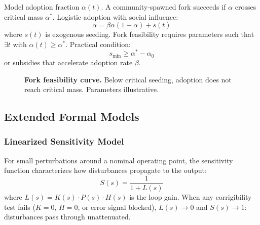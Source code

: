 Model adoption fraction $\alpha(t)$. A community-spawned fork succeeds if $\alpha$ crosses critical mass $\alpha^*$. Logistic adoption with social influence:
\begin{equation}
\dot{\alpha} = \beta \alpha(1 - \alpha) + s(t)
\end{equation}
where $s(t)$ is exogenous seeding. Fork feasibility requires parameters such that $\exists t$ with $\alpha(t) \geq \alpha^*$. Practical condition:
\begin{equation}
s_{\min} \geq \alpha^* - \alpha_0
\end{equation}
or subsidies that accelerate adoption rate $\beta$.

\begin{figure}[htbp]
\centering
{}
\caption{\textbf{Fork feasibility curve.} Below critical seeding, adoption does not reach critical mass. Parameters illustrative.}
\label{fig:fork-feasibility}
\end{figure}

\subsection{Extended Formal Models}

\subsubsection{Linearized Sensitivity Model}

For small perturbations around a nominal operating point, the sensitivity function characterizes how disturbances propagate to the output:
\begin{equation}
S(s) = \frac{1}{1 + L(s)}
\end{equation}
where $L(s) = K(s) \cdot P(s) \cdot H(s)$ is the loop gain. When any corrigibility test fails ($K=0$, $H=0$, or error signal blocked), $L(s) \to 0$ and $S(s) \to 1$: disturbances pass through unattenuated.


